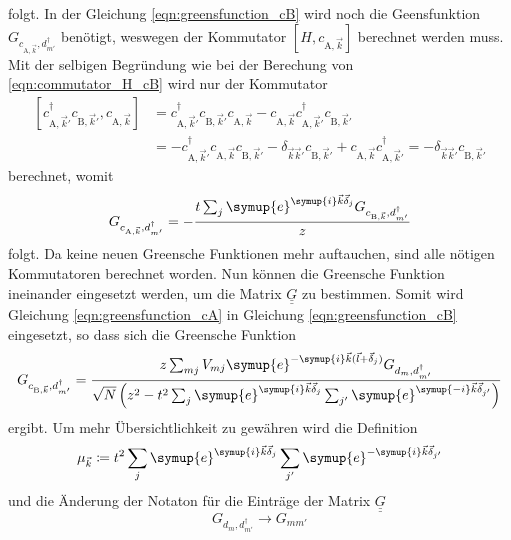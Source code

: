 folgt.
In der Gleichung \eqref{eqn:greensfunction_cB} wird noch die Geensfunktion $G_{c_{\text{A},\vec{k}},d^\dagger_{m'}}$ benötigt, weswegen der Kommutator
$\left [H, c_{\text{A},\vec{k}} \right ]$ berechnet werden muss.
Mit der selbigen Begründung wie bei der Berechung von \eqref{eqn:commutator_H_cB} wird nur der Kommutator
\begin{align*}
    \left [ c^\dagger_{\text{A},\vec{k}'} c_{\text{B},\vec{k}'}, c_{\text{A},\vec{k}} \right ]  &= c^\dagger_{\text{A},\vec{k}'}  c_{\text{B},\vec{k}'} c_{\text{A},\vec{k}}
    - c_{\text{A},\vec{k}} c^\dagger_{\text{A},\vec{k}'} c_{\text{B},\vec{k}'} \\
    &= - c^\dagger_{\text{A},\vec{k}'}  c_{\text{A},\vec{k}} c_{\text{B},\vec{k}'} - \delta_{\vec{k}\vec{k}'} c_{\text{B},\vec{k}'} 
    + c_{\text{A},\vec{k}} c^\dagger_{\text{A},\vec{k}'} = - \delta_{\vec{k}\vec{k}'} c_{\text{B},\vec{k}'} 
\end{align*}
berechnet, womit 
\begin{equation}
    G_{c_{\text{A},\vec{k}},d^\dagger_{m'}} = - \frac{t \sum_{j}\symup{e}^{\symup{i}\vec{k}\vec{\delta}_j} G_{c_{\text{B},\vec{k}}, d^\dagger_{m'}}} {z} \label{eqn:greensfunction_cA}
\end{equation}
folgt.
Da keine neuen Greensche Funktionen mehr auftauchen, sind alle nötigen Kommutatoren berechnet worden. 
Nun können die Greensche Funktion ineinander eingesetzt werden, um die Matrix $\underline{\underline{G}}$ zu bestimmen.
Somit wird Gleichung \eqref{eqn:greensfunction_cA} in Gleichung \eqref{eqn:greensfunction_cB} eingesetzt, so dass sich die Greensche Funktion
\begin{equation}
    G_{c_{\text{B},\vec{k}}, d^\dagger_{m'}} = \frac{z\sum_{mj} V_{mj} \symup{e}^{-\symup{i}\vec{k} (\vec{l}+\vec{\delta}_j)} G_{d_m, d_{m'}^\dagger}}
    {\sqrt{N}\left ( z^2-t^2\sum_j \symup{e}^{\symup{i}\vec{k}\vec{\delta}_j} \sum_{j'} \symup{e}^{\symup{-i}\vec{k}\vec{\delta}_{j'}} \right )} \label{eqn:finalgreencB}
\end{equation}
ergibt.
Um mehr Übersichtlichkeit zu gewähren wird die Definition
\begin{equation*}
     \mu_{\vec{k}} \coloneq t^2 \sum_j \symup{e}^{\symup{i}\vec{k}\vec{\delta}_j} \sum_{j'} \symup{e}^{-\symup{i}\vec{k}\vec{\delta}_{j'}} 
\end{equation*}  
und die Änderung der Notaton für die Einträge der Matrix $\underline{\underline{G}}$
\begin{equation*}
    G_{d_m, d^\dagger_{m'}} \to G_{mm'}
\end{equation*}
